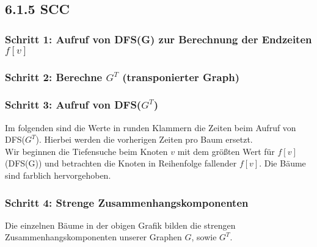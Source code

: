 
\gdef\Gfill{green}
\gdef\Gdesc{G[8/9]}
\gdef\Ffill{green}
\gdef\Fdesc{F[7/10]}
\gdef\Cfill{green}
\gdef\Cdesc{C[6/11]}
\gdef\Efill{green}
\gdef\Edesc{E[5/12]}
\gdef\Bfill{green}
\gdef\Bdesc{B[4/13]}
\gdef\Dfill{green}
\gdef\Ddesc{D[3/14]}
\gdef\Afill{green}
\gdef\Adesc{A[2/15]}
\gdef\sfill{green}
\gdef\sdesc{s[1/16]}
\subsection*{6.1.5 SCC}
\subsubsection*{Schritt 1: Aufruf von DFS(G) zur Berechnung der Endzeiten $f[v]$}


\subsubsection*{Schritt 2: Berechne $G^T$ (transponierter Graph)}


\subsubsection*{Schritt 3: Aufruf von DFS($G^T$)}
Im folgenden sind die Werte in runden Klammern die Zeiten beim Aufruf von DFS($G^T$). Hierbei werden die vorherigen Zeiten pro Baum ersetzt.\\
Wir beginnen die Tiefensuche beim Knoten $v$ mit dem größten Wert für $f[v]$(DFS(G)) und betrachten die Knoten in Reihenfolge fallender $f[v]$.
Die Bäume sind farblich hervorgehoben.

\gdef\sdesc{s(1/2)}
\gdef\sfill{yellow}


\gdef\Adesc{A(3/16)}
\gdef\Afill{magenta}
\gdef\Bdesc{B(4/15)}
\gdef\Bfill{magenta}
\gdef\Cdesc{C(5/14)}
\gdef\Cfill{magenta}
\gdef\Edesc{E(6/13)}
\gdef\Efill{magenta}
\gdef\Gdesc{G(7/12)}
\gdef\Gfill{magenta}
\gdef\Ddesc{D(8/9)}
\gdef\Dfill{magenta}
\gdef\Fdesc{F(10/11)}
\gdef\Ffill{magenta}


\subsubsection*{Schritt 4: Strenge Zusammenhangskomponenten}
Die einzelnen Bäume in der obigen Grafik bilden die strengen Zusammenhangskomponenten unserer Graphen $G$, sowie $G^T$.